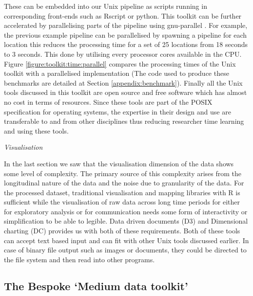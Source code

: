 These can be embedded into our Unix pipeline as scripts running in corresponding front-ends such as Rscript or python.
This toolkit can be further accelerated by parallelising parts of the pipeline using gnu-parallel \cite{tange2018}.
For example, the previous example pipeline can be parallelised by spawning a pipeline for each location this reduces the processing time for a set of 25 locations from 18 seconds to 3 seconds.
This done by utilising every processor cores available in the CPU.
Figure \ref{figure:toolkit:time:parallel} compares the processing times of the Unix toolkit with a parallelised implementation (The code used to produce these benchmarks are detailed at Section \ref{appendix:benchmark}).
Finally all the Unix tools discussed in this toolkit are open source and free software which has almost no cost in terms of resources.
Since these tools are part of the POSIX specification \cite{walli1995} for operating systems, the expertise in their design and use are transferable to and from other disciplines thus reducing researcher time learning and using these tools.



\vspace{1.5em}\noindent\textit{Visualisation}\vspace{0.5em}

In the last section we saw that the visualisation dimension of the data shows some level of complexity.
The primary source of this complexity arises from the longitudinal nature of the data and the noise due to granularity of the data.
For the processed dataset, traditional visualisation and mapping libraries with R is sufficient while the visualisation of raw data across long time periods for either for exploratory analysis or for communication needs some form of interactivity or simplification to be able to legible.
Data driven documents (D3) \cite{stanford2011} and Dimensional charting (DC) provides us with both of these requirements.
Both of these tools can accept text based input and can fit with other Unix tools discussed earlier.
In case of binary file output such as images or documents, they could be directed to the file system and then read into other programs.


\subsection{The Bespoke `Medium data toolkit'}

